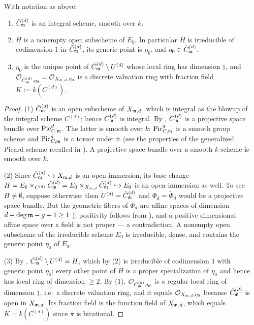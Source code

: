 \begin{lemma}\label{lemma:boundary_of_compactification_r2}
    With notation as above:
    \begin{enumerate}
        \item $\Cmod{d}$ is an integral scheme, smooth over $k$.
        \item $H$ is a nonempty open subscheme of $E_0$. In particular $H$ is irreducible of
              codimension $1$ in $\Cmod{d}$, its generic point is $\eta_0$, and $\eta_0 \in \Cmod{d}$.
        \item $\eta_0$ is the unique point of $\Cmod{d} \setminus U^{(d)}$ whose local ring has dimension $1$,
              and $\Oo_{\Cmod{d}, \eta_0} = \Oo_{X_{\mdls,d}, \eta_0}$ is a discrete valuation ring
              with fraction field $K := k(C^{(d)})$.
    \end{enumerate}
\end{lemma}
\begin{proof}
    (1) $\Cmod{d}$ is an open subscheme of $X_{\mdls,d}$, which is integral as the blowup of the
    integral scheme $C^{(d)}$; hence $\Cmod{d}$ is integral.
    By , $\Cmod{d}$ is a projective space bundle over
    $\PicCm[d]$. The latter is smooth over $k$: $\PicCm[0]$ is a smooth group scheme and $\PicCm[d]$
    is a torsor under it (see the properties of the generalized Picard scheme recalled in
    ). A projective space bundle over a smooth $k$-scheme is smooth over $k$.

    (2) Since $\Cmod{d} \hookrightarrow X_{\mdls,d}$ is an open immersion, its base change
    $H = E_0 \times_{C^{(d)}} \Cmod{d} = E_0 \times_{X_{\mdls,d}} \Cmod{d} \hookrightarrow E_0$
    is an open immersion as well. To see $H \neq \emptyset$, suppose otherwise; then
    $U^{(d)} = \Cmod{d}$ and $\Phi_d = \tilde{\Phi}_d$ would be a projective space bundle. But the
    geometric fibers of $\Phi_d$ are affine spaces of dimension $d - \deg \mdls - g + 1 \geq 1$
    (; positivity follows from ),
    and a positive dimensional affine space over a field is not proper --- a contradiction.
    A nonempty open subscheme of the irreducible scheme $E_0$ is irreducible, dense, and contains the
    generic point $\eta_0$ of $E_0$.

    (3) By , $\Cmod{d} \setminus U^{(d)} = H$,
    which by (2) is irreducible of codimension $1$ with generic point $\eta_0$; every other point of $H$
    is a proper specialization of $\eta_0$ and hence has local ring of dimension $\geq 2$.
    By (1), $\Oo_{\Cmod{d}, \eta_0}$ is a regular local ring of dimension $1$, i.e.\ a discrete
    valuation ring, and it equals $\Oo_{X_{\mdls,d}, \eta_0}$ because $\Cmod{d}$ is open in $X_{\mdls,d}$.
    Its fraction field is the function field of $X_{\mdls,d}$, which equals $K = k(C^{(d)})$
    since $\pi$ is birational.
\end{proof}

